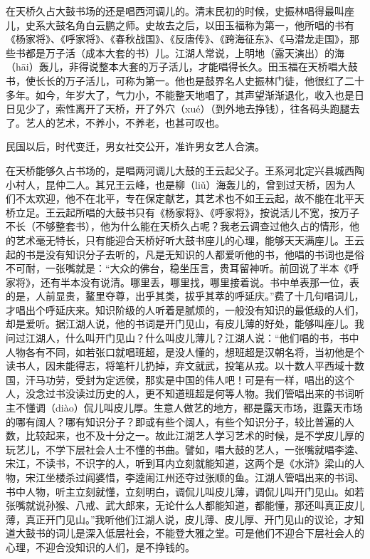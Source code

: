 \documentclass[12pt,UTF8]{ctexbook}
\begin{document}
在天桥久占大鼓书场的还是唱西河调儿的。清末民初的时候，史振林唱得最叫座儿，史系大鼓名角白云鹏之师。史故去之后，以田玉福称为第一，他所唱的书有《杨家将》、《呼家将》、《春秋战国》、《反唐传》、《跨海征东》、《马潜龙走国》，那些书都是万子活（成本大套的书）儿。江湖人常说，上明地（露天演出）的海（hāi）轰儿，非得说整本大套的万子活儿，才能唱得长久。田玉福在天桥唱大鼓书，使长长的万子活儿，可称为第一。他也是鼓界名人史振林门徒，他很红了二十多年。如今，年岁大了，气力小，不能整天地唱了，其声望渐渐退化，收入也是日日见少了，索性离开了天桥，开了外穴（xué）（到外地去挣钱），往各码头跑腿去了。艺人的艺术，不养小，不养老，也甚可叹也。

民国以后，时代变迁，男女社交公开，准许男女艺人合演。



在天桥能够久占书场的，是唱两河调儿大鼓的王云起父子。王系河北定兴县城西陶小村人，昆仲二人。其兄王云峰，也是柳（liǔ）海轰儿的，曾到过天桥，因为人们不太欢迎，他不在北平，专在保定献艺，其艺术也不如王云起，故不能在北平天桥立足。王云起所唱的大鼓书只有《杨家将》、《呼家将》，按说活儿不宽，按万子不长（不够整套书），他为什么能在天桥久占呢？我老云调查过他久占的情形，他的艺术毫无特长，只有能迎合天桥好听大鼓书座儿的心理，能够天天满座儿。王云起的书是没有知识分子去听的，凡是无知识的人都爱听他的书，他唱的书词也是俗不可耐，一张嘴就是：“大众的佛台，稳坐压言，贵耳留神听。前回说了半本《呼家将》，还有半本没有说清。哪里丢，哪里找，哪里接着说。书中单表那一位，表的是，人前显贵，鳌里夺尊，出乎其类，拔乎其萃的呼延庆。”费了十几句唱词儿，才唱出个呼延庆来。知识阶级的人听着是腻烦的，一般没有知识的最低级的人们，却是爱听。据江湖人说，他的书词是开门见山，有皮儿薄的好处，能够叫座儿。我问过江湖人，什么叫开门见山？什么叫皮儿薄儿？江湖人说：“他们唱的书，书中人物各有不同，如若张口就唱班超，是没人懂的，想班超是汉朝名将，当初他是个读书人，因未能得志，将笔杆儿扔掉，弃文就武，投笔从戎。以十数人平西域十数国，汗马功劳，受封为定远侯，那实是中国的伟人吧！可是有一样，唱出的这个人，没念过书没读过历史的人，更不知道班超是何等人物。我们管唱出来的书词听主不懂调（diào）侃儿叫皮儿厚。生意人做艺的地方，都是露天市场，逛露天市场的哪有阔人？哪有知识分子？即或有些个阔人，有些个知识分子，较比普遍的人数，比较起来，也不及十分之一。故此江湖艺人学习艺术的时候，是不学皮儿厚的玩艺儿，不学下层社会人士不懂的书曲。譬如，唱大鼓的艺人，一张嘴就唱李逵、宋江，不读书，不识字的人，听到耳内立刻就能知道，这两个是《水浒》梁山的人物，宋江坐楼杀过阎婆惜，李逵闹江州还夺过张顺的鱼。江湖人管唱出来的书词、书中人物，听主立刻就懂，立刻明白，调侃儿叫皮儿薄，调侃儿叫开门见山。如若张嘴就说孙猴、八戒、武大郎来，无论什么人都能知道，都能懂，那还叫真正皮儿薄，真正开门见山。”我听他们江湖人说，皮儿薄、皮儿厚、开门见山的议论，才知道大鼓书的词儿是深入低层社会，不能登大雅之堂。可是他们不迎合下层社会人的心理，不迎合没知识的人们，是不挣钱的。
\end{document}
